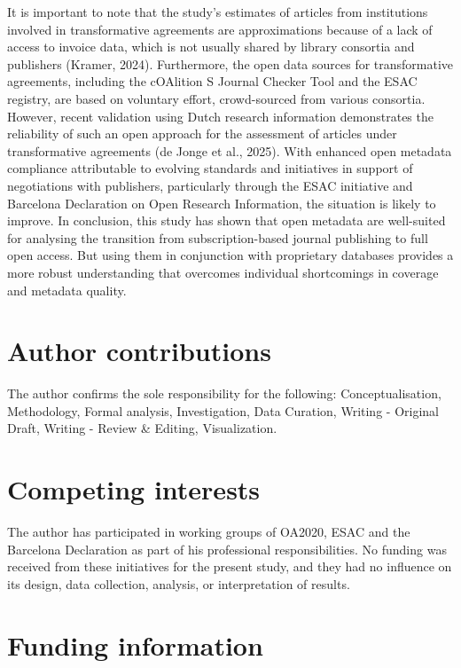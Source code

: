 \documentclass[a4paper,man,floatsintext,longtable,noextraspace,10pt]{apa6}
\begin{document}
It is important to note that the study's estimates of articles from
institutions involved in transformative agreements are approximations
because of a lack of access to invoice data, which is not usually shared
by library consortia and publishers (Kramer, 2024). Furthermore, the
open data sources for transformative agreements, including the cOAlition
S Journal Checker Tool and the ESAC registry, are based on voluntary
effort, crowd-sourced from various consortia. However, recent validation
using Dutch research information demonstrates the reliability of such an
open approach for the assessment of articles under transformative
agreements (de Jonge et al., 2025). With enhanced open metadata
compliance attributable to evolving standards and initiatives in support
of negotiations with publishers, particularly through the ESAC
initiative and Barcelona Declaration on Open Research Information, the
situation is likely to improve. In conclusion, this study has shown that
open metadata are well-suited for analysing the transition from
subscription-based journal publishing to full open access. But using
them in conjunction with proprietary databases provides a more robust
understanding that overcomes individual shortcomings in coverage and
metadata quality.

\section*{Author contributions}\label{author-contributions}

The author confirms the sole responsibility for the following:
Conceptualisation, Methodology, Formal analysis, Investigation, Data
Curation, Writing - Original Draft, Writing - Review \& Editing,
Visualization.

\section*{Competing interests}\label{competing-interests}

The author has participated in working groups of OA2020, ESAC and the
Barcelona Declaration as part of his professional responsibilities. No
funding was received from these initiatives for the present study, and
they had no influence on its design, data collection, analysis, or
interpretation of results.

\section*{Funding information}\label{funding-information}
\end{document}
